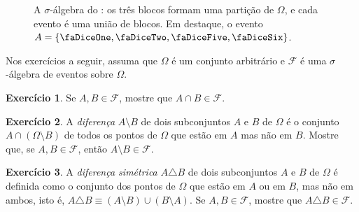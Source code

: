\documentclass[12pt,portuguese]{article}
\theoremstyle{definition}
\newtheorem{exercise}{Exercício}
\begin{document}
\begin{figure}[htbp]
\centering
{}
\caption{A \(\sigma\)-álgebra do : os três blocos formam uma
partição de \(\Omega\), e cada evento é uma união de blocos. Em destaque,
o evento
\(A = \{\text{\faDiceOne}, \text{\faDiceTwo}, \text{\faDiceFive},
\text{\faDiceSix}\}\).}\label{fig:atomos}
\end{figure}

Nos exercícios a seguir, assuma que \(\Omega\) é um conjunto arbitrário 
e \(\mathcal{F}\) é uma $\sigma$-álgebra de eventos sobre \(\Omega\).

\begin{exercise}\label{exercise:1.8}
Se \(A, B \in \mathcal{F}\), mostre que \(A \cap B \in \mathcal{F}\).
\end{exercise}

\begin{exercise}\label{exercise:1.9}
A \emph{diferença} \(A \setminus B\) de dois subconjuntos \(A\) e \(B\) de
\(\Omega\) é o conjunto \(A \cap (\Omega \setminus B)\) de todos os pontos
de \(\Omega\) que estão em \(A\) mas não em \(B\). Mostre que, se \(A, B \in
\mathcal{F}\), então \(A \setminus B \in \mathcal{F}\).
\end{exercise}

\begin{exercise}\label{exercise:1.10}
A \emph{diferença simétrica} \(A \triangle B\) de dois subconjuntos \(A\) e
\(B\) de \(\Omega\) é definida como o conjunto dos pontos de \(\Omega\) que
estão em \(A\) ou em \(B\), mas não em ambos, 
isto é, $A \triangle B \equiv (A\setminus B) \cup (B\setminus A) $. 
Se \(A, B \in \mathcal{F}\), mostre que \(A \triangle B \in \mathcal{F}\).
\end{exercise}
\end{document}
